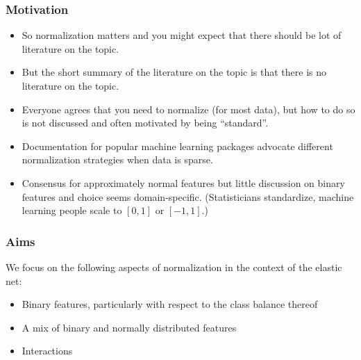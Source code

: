 \documentclass[10pt]{beamer}
\begin{document}
\begin{frame}[c]
  \frametitle{Motivation}

  \begin{itemize}[<+->]
    \item So normalization matters and you might expect that there should be lot of literature on the
          topic.
    \item But the short summary of the literature on the topic is that there is no literature on the
          topic.
    \item Everyone agrees that you need to normalize (for most data), but how to do so is not
          discussed and often motivated by being ``standard''.
    \item Documentation for popular machine learning packages advocate different normalization
          strategies when data is sparse.
    \item Consensus for approximately normal features but little discussion on binary features and
          choice seems domain-specific. (Statisticians standardize, machine learning people scale to
          $[0, 1]$ or $[-1, 1]$.)
  \end{itemize}
\end{frame}

\begin{frame}
  \frametitle{Aims}

  We focus on the following aspects of normalization in the context of the elastic net:
  \begin{itemize}
    \item Binary features, particularly with respect to the \alert{class balance} thereof
    \item A mix of binary and normally distributed features
    \item Interactions
  \end{itemize}


\end{frame}
\end{document}

